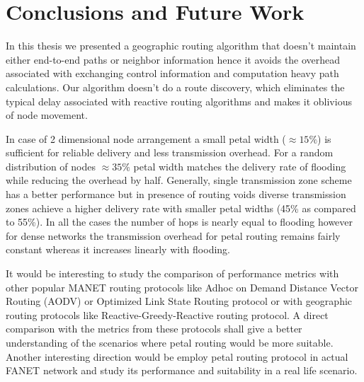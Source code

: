 \chapter{Conclusions and Future Work}
\label{chap-six}

In this thesis we presented a geographic routing algorithm that doesn't maintain either end-to-end paths or neighbor information hence it avoids the overhead associated with exchanging control information and computation heavy path calculations. Our algorithm doesn't do a route discovery, which eliminates the typical delay associated with reactive routing algorithms and makes it oblivious of node movement. 

In case of 2 dimensional node arrangement a small petal width ($\approx 15\%$) is sufficient for reliable delivery and less transmission overhead. For a random distribution of nodes $\approx 35 \% $ petal width matches the delivery rate of flooding while reducing the overhead by half. Generally, single transmission zone scheme has a better performance but in presence of routing voids diverse transmission zones achieve a higher delivery rate with smaller petal widths (45\% as compared to 55\%). In all the cases the number of hops is nearly equal to flooding however for dense networks the transmission overhead for petal routing remains fairly constant whereas it increases linearly with flooding. 

 It would be interesting to study the comparison of performance metrics with other popular MANET routing protocols like Adhoc on Demand Distance Vector Routing (AODV) or Optimized Link State Routing protocol or with geographic routing protocols like Reactive-Greedy-Reactive routing protocol. A direct comparison with the metrics from these protocols shall give a better understanding of the scenarios where petal routing would be more suitable. Another interesting direction would be employ petal routing protocol in actual FANET network and study its performance and suitability in a real life scenario.